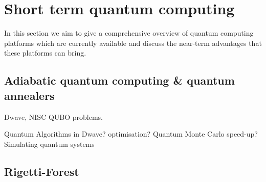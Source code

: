
\section{Short term quantum computing}
In this section we aim to give a comprehensive overview of quantum computing platforms which are currently available and discuss the near-term advantages that these platforms can bring.

\subsection{Adiabatic quantum computing \& quantum annealers}
Dwave, NISC
QUBO problems.

Quantum Algorithms in Dwave? optimisation? Quantum Monte Carlo speed-up? Simulating quantum systems

\subsection{Rigetti-Forest}


